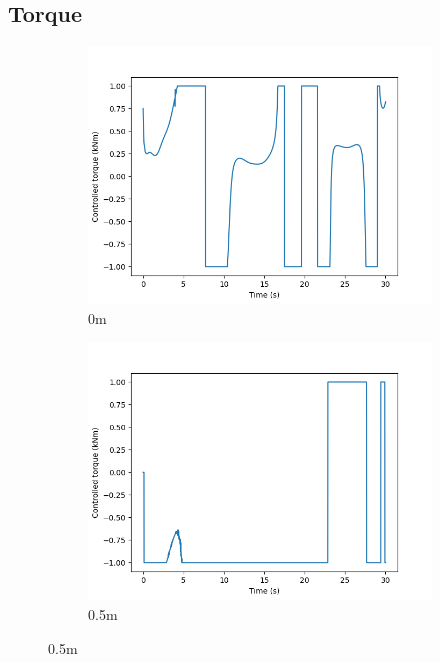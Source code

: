 \documentclass[class=article, crop=false]{standalone}
\begin{document}
\subsection{Torque}
\begin{figure}
    \centering
    \begin{subfigure}[b]{0.48\textwidth}
        \centering
        \includegraphics{scenario1/rov-0m/0.0m/usv_torque}
        \caption{0m}
        \label{}
    \end{subfigure}
    \hfill
    \begin{subfigure}[b]{0.48\textwidth}
        \centering
        \includegraphics{scenario1/rov-0m/0.5m/usv_torque}
        \caption{0.5m}
        \label{}
    \end{subfigure}

\end{figure}
\end{document}
